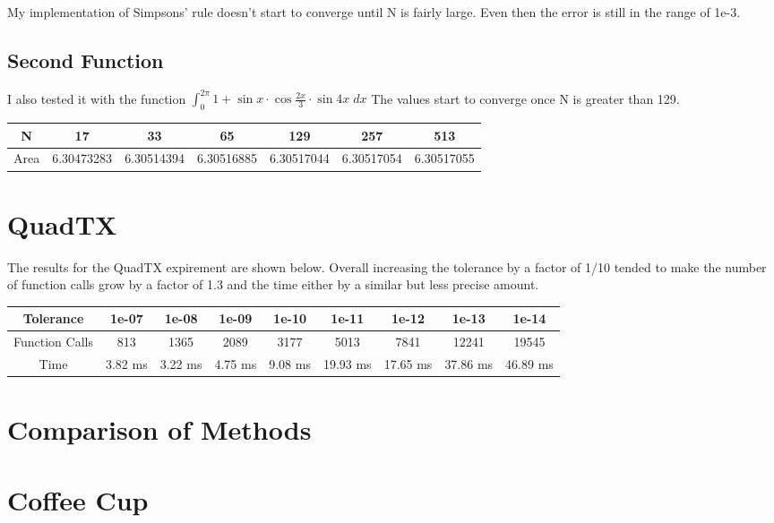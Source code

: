 \documentclass{article}
\begin{document}
My implementation of Simpsons' rule doesn't start to converge until N is fairly large. Even then the error is still in the range of 1e-3. 

\subsection{Second Function}

I also tested it with the function $\int_0^{2\pi} 1 + \sin{x} \cdot \cos{\frac{2x}{3}} \cdot \sin{4x} \;dx$ The values start to converge once N is greater than 129.
\begin{center}
	\begin{tabular}{c|c|c|c|c|c|c}
N &		17 &	33 &	65 &	129 &	257 & 513\\ \hline
	Area &	6.30473283 &	6.30514394	& 6.30516885	& 6.30517044	& 6.30517054 &	6.30517055
	\end{tabular}	
\end{center}


\section{QuadTX}

The results for the QuadTX expirement are shown below. Overall increasing the tolerance by a factor of 1/10 tended to make the number of function calls grow by a factor of  1.3 and the time either by a similar but less precise amount.

\begin{center}
\begin{tabular}{c|c|c|c|c|c|c|c|c}
 Tolerance & 1e-07& 1e-08& 1e-09& 1e-10& 1e-11& 1e-12& 1e-13& 1e-14\\ \hline
Function Calls & 813& 1365& 2089& 3177& 5013& 7841& 12241& 19545\\ \hline
Time &  3.82 ms & 3.22 ms & 4.75 ms & 9.08 ms & 19.93 ms & 17.65 ms & 37.86 ms & 46.89 ms  \\
\end{tabular}
\end{center}


\section{Comparison of Methods}

\section{Coffee Cup}
\end{document}
